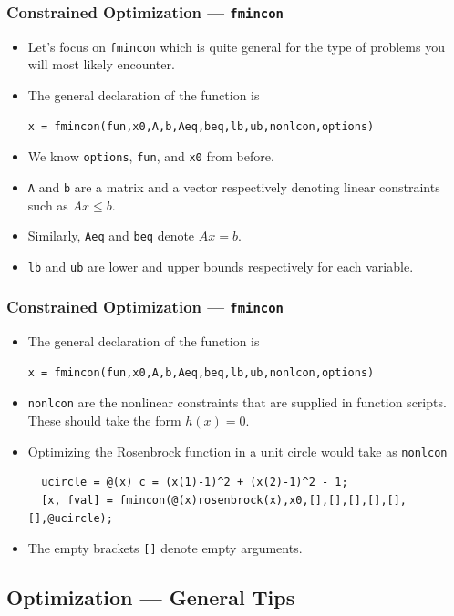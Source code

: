 \documentclass[11pt,xcolor={svgnames},aspectratio=169,usepdftitle=false]{beamer}
\begin{document}
\begin{frame}[fragile]
  \frametitle{Constrained Optimization --- \texttt{fmincon}}
\begin{itemize}
  \item Let's focus on \verb;fmincon; which is quite general for the type of problems you will most likely encounter.
  \item The general declaration of the function is
\begin{lstlisting}
x = fmincon(fun,x0,A,b,Aeq,beq,lb,ub,nonlcon,options)
\end{lstlisting}
  \item We know \verb;options;, \verb;fun;, and \verb;x0; from before.
  \item \verb;A; and \verb;b; are a matrix and a vector respectively denoting linear constraints such as $Ax\leq b$.
  \item Similarly, \verb;Aeq; and \verb;beq; denote $Ax = b$.
  \item \verb;lb; and \verb;ub; are lower and upper bounds respectively for each variable.
\end{itemize}
\end{frame}

\begin{frame}[fragile]
  \frametitle{Constrained Optimization --- \texttt{fmincon}}
\begin{itemize}
  \item The general declaration of the function is
\begin{lstlisting}
x = fmincon(fun,x0,A,b,Aeq,beq,lb,ub,nonlcon,options)
\end{lstlisting}
  \item \verb;nonlcon; are the nonlinear constraints that are supplied in function scripts. These should take the form $h(x) = 0$.
  \item Optimizing the Rosenbrock function in a unit circle would take as \verb;nonlcon;
  \begin{lstlisting}
  ucircle = @(x) c = (x(1)-1)^2 + (x(2)-1)^2 - 1;
  [x, fval] = fmincon(@(x)rosenbrock(x),x0,[],[],[],[],[],[],@ucircle);
  \end{lstlisting}
  \item The empty brackets \verb;[]; denote empty arguments.
\end{itemize}
\end{frame}

\subsection{Optimization --- General Tips}
\end{document}

